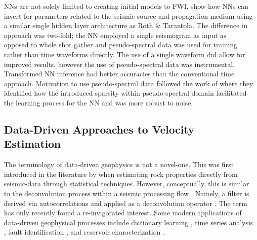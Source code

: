 NNs are not solely limited to creating initial models to FWI. \citet{Langer1996} show how NNs can invert for parameters related to the seismic source and propagation medium using a similar single hidden layer architecture as R{\"o}th \& Tarantola. The difference in approach was two-fold; the NN employed a single seismogram as input as opposed to whole shot gather and pseudo-spectral data was used for training rather than time waveforms directly. The use of a single waveform did allow for improved results, however the use of pseudo-spectral data was instrumental. Transformed NN inference had better accuracies than the conventional time approach. Motivation to use pseudo-spectral data followed the work of \citet{Falsaperla1996} where they identified how the introduced sparsity within pseudo-spectral domain facilitated the learning process for the NN and was more robust to noise.

\subsection{Data-Driven Approaches to Velocity Estimation}
The terminology of data-driven geophysics is not a novel-one. This was first introduced in the literature by \citet{Schultz1994} when estimating rock properties directly from seismic-data through statistical techniques. However, conceptually, this is similar to the deconvolution process within a seismic processing flow \citep{Robinson1957,Robinson1967}. Namely, a filter is derived via autocorrelations and applied as a deconvolution operator \citep{Webster1978}. The term has only recently found a re-invigorated interest. Some modern applications of data-driven geophysical processes include dictionary learning \citep{NazariSiahsar2017}, time series analysis \citep{Wu2018a}, fault identification \citep{Mangalathu2020}, and reservoir characterization \citep{Schakel2014}.

